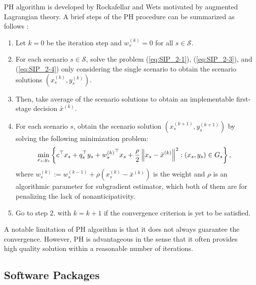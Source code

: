 PH algorithm is developed by Rockafellar and Wets \cite{journal:RW1991} motivated by augmented Lagrangian theory. 
A brief steps of the PH procedure can be summarized as follows \cite{book:pyomo}:
\begin{enumerate}
	\item Let $k=0$ be the iteration step and $w_s^{(k)}=0$ for all $s\in\mathcal{S}$.
	\item For each scenario $s\in\mathcal{S}$, solve the problem (\ref{eq:SIP_2-1}), (\ref{eq:SIP_2-3}), and (\ref{eq:SIP_2-4}) only considering the single scenario to obtain the scenario solutions $(x_s^{(k)},y_s^{(k)})$.
	\item Then, take average of the scenario solutions to obtain an implementable first-stage decision $\bar{x}^{(k)}$.
	\item For each scenario $s$, obtain the scenario solution $(x_s^{(k+1)},y_s^{(k+1)})$ by solving the following minimization problem:
	\begin{align*}
	\min_{x_s,y_s}\left\{c^\top x_s+q_s^\top y_s + {w_s^{(k)}}^\top x_s +\frac{\rho}{2}\left\lVert x_s-\bar{x}^{(k)}\right\rVert^2 : (x_s,y_s)\in G_s \right\},
	\end{align*}
	where ${w_s^{(k)}}:={w_s^{(k-1)}}+\rho(x_s^{(k)}-\bar{x}^{(k)})$ is the weight and $\rho$ is an algorithmic parameter for subgradient estimator, which both of them are for penalizing the lack of nonanticipativity.
	\item Go to step 2. with $k=k+1$ if the convergence criterion is yet to be satisfied. 
\end{enumerate}
A notable limitation of PH algorithm is that it does not always guarantee the convergence. However, PH is advantageous in the sense that it often provides high quality solution within a reasonable number of iterations. 

\subsection{Software Packages}


